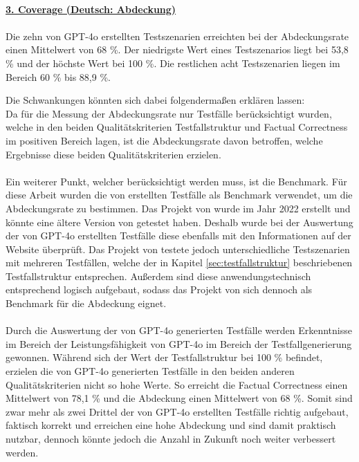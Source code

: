 \documentclass[12pt,toc=bib,toc=listof]{scrreprt}
\begin{document}
\\
\textbf{\underline{3. Coverage (Deutsch: Abdeckung)}}\\
\\
Die zehn von GPT-4o erstellten Testszenarien erreichten bei der Abdeckungsrate einen Mittelwert von 68 \%. Der niedrigste Wert eines Testszenarios liegt bei 53,8 \% und der höchste Wert bei 100 \%. Die restlichen acht
Testszenarien liegen im Bereich 60 \% bis 88,9 \%.
\newpage

\noindent Die Schwankungen könnten sich dabei folgendermaßen erklären lassen:\\
\noindent Da für die Messung der Abdeckungsrate nur Testfälle berücksichtigt wurden, welche in den beiden Qualitätskriterien \glqq Testfallstruktur\grqq{} und \glqq Factual Correctness\grqq{} im positiven Bereich lagen, ist die Abdeckungsrate davon betroffen, welche Ergebnisse diese beiden Qualitätskriterien erzielen.\\
\\
Ein weiterer Punkt, welcher berücksichtigt werden muss, ist die Benchmark. Für diese Arbeit wurden die von \textcite{Pavankumar21github2022} erstellten Testfälle als Benchmark verwendet, um die Abdeckungsrate zu bestimmen. Das Projekt von \textcite{Pavankumar21github2022} wurde im Jahr 2022 erstellt und könnte eine ältere Version von \textcite{OpenCart2025} getestet haben. Deshalb wurde bei der Auswertung der von GPT-4o erstellten Testfälle diese ebenfalls mit den Informationen auf der \textcite{OpenCart2025} Website überprüft. Das Projekt von \textcite{Pavankumar21github2022} testete jedoch unterschiedliche Testszenarien mit mehreren Testfällen, welche der in Kapitel \ref{sec:testfallstruktur} beschriebenen Testfallstruktur entsprechen. Außerdem sind diese anwendungstechnisch entsprechend logisch aufgebaut, sodass das Projekt von \textcite{Pavankumar21github2022} sich dennoch als Benchmark für die Abdeckung eignet.\\
\\
Durch die Auswertung der von GPT-4o generierten Testfälle werden Erkenntnisse im Bereich der Leistungsfähigkeit von GPT-4o im Bereich der Testfallgenerierung gewonnen. Während sich der Wert der Testfallstruktur bei 100 \% befindet, erzielen die von GPT-4o generierten Testfälle in den beiden anderen Qualitätskriterien nicht so hohe Werte. So erreicht die Factual Correctness einen Mittelwert von 78,1 \% und die Abdeckung einen Mittelwert von 68 \%. Somit sind zwar mehr als zwei Drittel der von GPT-4o erstellten Testfälle richtig aufgebaut, faktisch korrekt und erreichen eine hohe Abdeckung und sind damit praktisch nutzbar, dennoch könnte jedoch die Anzahl in Zukunft noch weiter verbessert werden.
\end{document}
